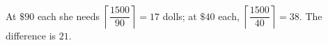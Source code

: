At $\$90$ each she needs $\left\lceil\dfrac{1500}{90}\right\rceil=17$ dolls; at $\$40$ each, $\left\lceil\dfrac{1500}{40}\right\rceil=38$. The difference is $\boxed{21}$.
